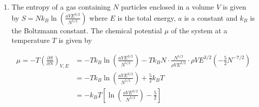 \begin{enumerate}
\begin{tasks}(4)
\task[\textbf{A.}] $\frac{N}{2}$
\task[\textbf{B.}] $\frac{N}{e^{\varepsilon / k T}+1}$ 
\task[\textbf{C.}] $\frac{N}{e^{-\varepsilon / k T}+1}$
\task[\textbf{D.}] $N e^{\frac{-\varepsilon}{k T}}$
\end{tasks}
\begin{answer}
	$$\begin{aligned}
	\langle N\rangle&=N e^{\frac{-\left(E_{2}-E_{1}\right)}{k T}}\\
	&=N e^{\frac{-\left[\left(E_{1}+\varepsilon\right)-E_{1}\right]}{k T}} \\ 
	\langle N\rangle& =N e^{\frac{-\varepsilon}{k T}}
	\end{aligned}$$

Correct answer is \textbf{option (D)}
\end{answer}
\item The entropy of a gas containing $N$ particles enclosed in a volume $V$ is given by $S=N k_{B} \ln \left(\frac{a V E^{3 / 2}}{N^{5 / 2}}\right)$
where $E$ is the total energy, $a$ is a constant and $k_{B}$ is the Boltzmann constant. The chemical potential $\mu$ of the system at a temperature $T$ is given by
\begin{answer}
	$$\begin{aligned}
	\mu=-T\left(\frac{\partial S}{\partial N}\right)_{V, E}&=-T k_{B} \ln \left(\frac{a V E^{3 / 2}}{N^{5 / 2}}\right)-T k_{B} N \cdot \frac{N^{5 / 2}}{\rho V E^{3 / 2}} \cdot \rho V E^{3 / 2}\left(-\frac{5}{2} N^{-7 / 2}\right)\\
	&=-T k_{B} \ln \left(\frac{a V E^{3 / 2}}{N^{5 / 2}}\right)+\frac{5}{2} k_{B} T\\
	&=-k_{B} T\left[\ln \left(\frac{a V E^{3 / 2}}{N^{5 / 2}}\right)-\frac{5}{2}\right]
	\end{aligned}$$
\end{answer}
	

\end{enumerate}
